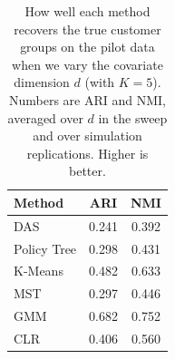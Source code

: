 \begin{table}[htbp]
\centering
\caption{How well each method recovers the true customer groups on the pilot data when we vary the covariate dimension $d$ (with $K=5$). Numbers are ARI and NMI, averaged over $d$ in the sweep and over simulation replications. Higher is better.}
\label{tab:app-ari-nmi-varying-d-avg}
\begin{tabular}{lcc}
\toprule
Method & ARI & NMI \\
\midrule
DAS & 0.241 & 0.392 \\
Policy Tree & 0.298 & 0.431 \\
K-Means & 0.482 & 0.633 \\
MST & 0.297 & 0.446 \\
GMM & 0.682 & 0.752 \\
CLR & 0.406 & 0.560 \\
\bottomrule
\end{tabular}
\end{table}
